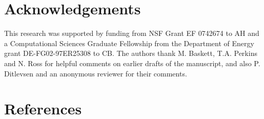 \documentclass[authoryear,review,12pt]{elsarticle}
\begin{document}
 \section{Acknowledgements}
This research was supported by funding from NSF Grant EF 0742674 to AH
and a Computational Sciences Graduate Fellowship from the Department of
Energy grant DE-FG02-97ER25308 to CB. The authors thank M. Baskett, 
T.A. Perkins and N. Ross for helpful comments on earlier drafts of the
manuscript, and also P. Ditlevsen and an anonymous reviewer for their 
comments.  

\section{References}%


 
\end{document}
